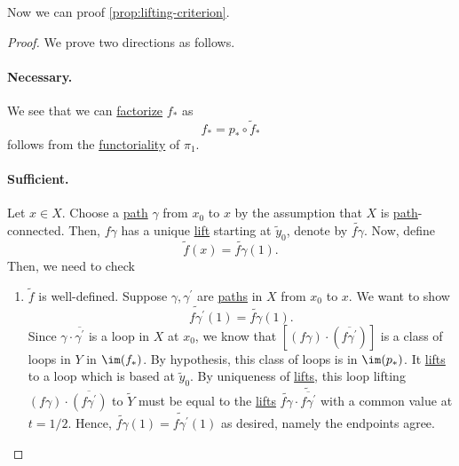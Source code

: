\par Now we can proof \autoref{prop:lifting-criterion}.
\begin{proof}\let\qed\relax
	We prove two directions as follows.
	\paragraph{Necessary.} We see that we can \hyperref[def:factorization]{factorize} \(f_\ast\) as
	\[
		f_\ast = p_\ast \circ \widetilde{f} _\ast
	\]
	follows from the \hyperref[def:functor]{functoriality} of \(\pi _1\).
	\paragraph{Sufficient.} Let \(x\in X\). Choose a \hyperref[def:path]{path} \(\gamma\) from \(x_0\) to \(x\) by the assumption that \(X\) is \hyperref[def:path]{path}-connected.
	Then, \(f \gamma \) has a unique \hyperref[prop:homotopy-lifting-property]{lift} starting at \(\widetilde{y} _0\), denote by \(\widetilde{f\gamma}\).
	Now, define
	\[
		\widetilde{f} (x) = \widetilde{f \gamma } (1).
	\]
	Then, we need to check
	\begin{enumerate}
		\item \(\widetilde{f} \) is well-defined. Suppose \(\gamma , \gamma ^\prime \) are \hyperref[def:path]{paths} in \(X\) from \(x_0\)
		      to \(x\). We want to show
		      \[
			      \widetilde{f \gamma^\prime} (1) = \widetilde{f \gamma } (1).
		      \]
		      Since \(\gamma \cdot \overline{\gamma^\prime}\) is a loop in \(X\) at \(x_{0}\), we know that \([(f \gamma)\cdot (\overline{f \gamma ^\prime}) ]\) is a class of
		      loops in \(Y\) in \(\im  (f_\ast)\). By hypothesis, this class of loops is in \(\im  (p_*)\).
		      It \hyperref[prop:homotopy-lifting-property]{lifts} to a loop which is based at \(\widetilde{y} _0\). By uniqueness of
		      \hyperref[prop:homotopy-lifting-property]{lifts}, this loop lifting \((f \gamma )\cdot \overline{(f \gamma ^\prime )}\) to \(\widetilde{Y} \)
		      must be equal to the \hyperref[prop:homotopy-lifting-property]{lifts} \(\widetilde{f \gamma }\cdot \widetilde{\overline{f \gamma ^\prime }}  \)
		      with a common value at \(t = 1 / 2\). Hence, \(\widetilde{f \gamma }(1) = \widetilde{f \gamma ^\prime }(1)\) as desired, namely the endpoints agree.
		      \begin{figure}[H]
			      \centering
			      \label{fig:pf:prop:lifting-criterion}
		      \end{figure}
	\end{enumerate}
\end{proof}